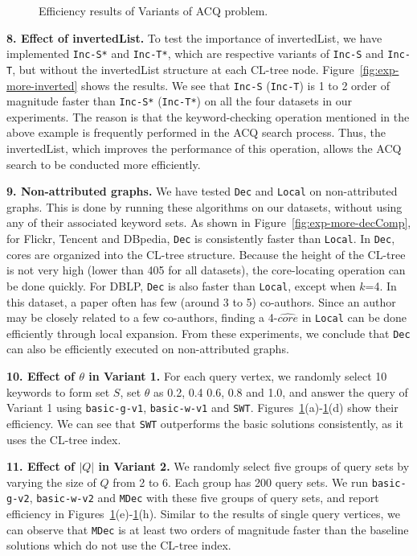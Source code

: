 \begin{figure}[htb]
\begin{tabular}{c c c c}
\end{tabular}
\caption{Efficiency results of Variants of ACQ problem.}
\label{fig:exp-variant}
\end{figure}


\textbf{8. Effect of invertedList.}
To test the importance of invertedList, we have implemented {\tt Inc-S*} and {\tt Inc-T*}, which are respective variants of {\tt Inc-S} and {\tt Inc-T}, but without the invertedList structure at each CL-tree node. Figure~\ref{fig:exp-more-inverted} shows the results. We see that {\tt Inc-S} ({\tt Inc-T}) is 1 to 2 order of magnitude faster than {\tt Inc-S*} ({\tt Inc-T*}) on all the four datasets in our experiments.
The reason is that the keyword-checking operation mentioned in the above example is frequently performed in the ACQ search process. Thus, the invertedList, which improves the performance of this operation, allows the ACQ search to be conducted more efficiently.

\textbf{9. Non-attributed graphs.}
We have tested {\tt Dec} and {\tt Local} on non-attributed graphs. This is done by running these algorithms on our datasets, without using any of their associated keyword sets. As shown in Figure~\ref{fig:exp-more-decComp}, for Flickr, Tencent and DBpedia, {\tt Dec} is consistently faster than {\tt Local}. In {\tt Dec}, cores are organized into the CL-tree structure. Because the height of the CL-tree is not very high (lower than 405 for all datasets), the core-locating operation can be done quickly. For DBLP, {\tt Dec} is also  faster than {\tt Local}, except when $k$=4. In this dataset, a paper often has few (around 3 to 5) co-authors. Since an author may be closely related to a few co-authors, finding a 4-$\widehat {core}$ in {\tt Local} can be done efficiently through local expansion.  From these experiments, we conclude that {\tt Dec} can also be efficiently executed on non-attributed graphs.

{\color{blue}
\textbf{10. Effect of $\theta$ in Variant 1.}
For each query vertex, we randomly select 10 keywords to form set $S$, set $\theta$ as 0.2, 0.4 0.6, 0.8 and 1.0,
and answer the query of Variant 1 using {\tt basic-g-v1}, {\tt basic-w-v1} and {\tt SWT}.
Figures~\ref{fig:exp-variant}(a)-\ref{fig:exp-variant}(d) show their efficiency.
We can see that {\tt SWT} outperforms the basic solutions consistently, as it uses the CL-tree index.

\textbf{11. Effect of $|Q|$ in Variant 2.}
We randomly select five groups of query sets by varying the size of $Q$ from 2 to 6.
Each group has 200 query sets.
We run {\tt basic-g-v2}, {\tt basic-w-v2} and {\tt MDec} with these five groups of query sets,
and report efficiency in Figures~\ref{fig:exp-variant}(e)-\ref{fig:exp-variant}(h).
Similar to the results of single query vertices, we can observe that {\tt MDec} is at least two orders of magnitude faster than the baseline solutions which do not use the CL-tree index.
}

